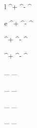 

\newmathsymbol{\lepton}      {l}
\newmathsymbol{\lepp}        {\lepton^+}
\newmathsymbol{\lepm}        {\lepton^-}
\newmathsymbol{\leppm}       {\lepton^\pm}
\newmathsymbol{\leplem}      {\lepp\lepm}

\newmathsymbol{\electron}    {e}
\newmathsymbol{\elp}         {\electron^+}
\newmathsymbol{\elm}         {\electron^-}
\newmathsymbol{\elpm}        {\electron^\pm}
\newmathsymbol{\elel}        {\elp\elm}

\newmathsymbol{\muon}        {\mu}
\newmathsymbol{\mup}         {\muon^+}
\newmathsymbol{\mum}         {\muon^-}
\newmathsymbol{\mupm}        {\muon^\pm}
\newmathsymbol{\mumu}        {\mup\mum}

\newmathsymbol{\tauon}       {\tau}
\newmathsymbol{\taup}        {\tauon^+}
\newmathsymbol{\taum}        {\tauon^-}
\newmathsymbol{\taupm}       {\tauon^\pm}
\newmathsymbol{\tautau}      {\taup\taum}

\newmathsymbol{\neutrino}    {\nu}
\newmathsymbol{\neutrinobar} {\ovE \neutrino}

\newmathsymbol{\nuel}        {\neutrino_\electron}
\newmathsymbol{\nuelbar}     {\neutrinobar_\electron}

\newmathsymbol{\numu}        {\neutrino_\muon}
\newmathsymbol{\numubar}     {\neutrinobar_\muon}

\newmathsymbol{\nutau}       {\neutrino_\tauon}
\newmathsymbol{\nutaubar}    {\neutrinobar_\tauon}

\newmathsymbol{\nulep}       {\neutrino_\lepton}
\newmathsymbol{\nulepbar}    {\neutrinobar_\lepton}
